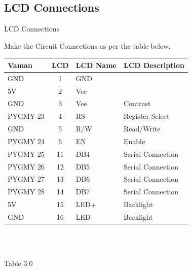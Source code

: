 \documentclass{beamer}
\theoremstyle{remark}
\begin{document}
\subsection{LCD Connections}
\begin{frame}{LCD Connections}
    \raggedright
    Make the Circuit Connections as per the table below.\\
    \vspace{0.25cm}
    \centering
        \begin{tabular}{|l|c|l|l|}
            \hline
            \textbf{Vaman} & \textbf{LCD} & \textbf{LCD Name} & \textbf{LCD Description} \\
            \hline
            GND & 1 & GND & \\
            \hline
            5V & 2 & Vcc & \\
            \hline
            GND & 3 & Vee & Contrast \\
            \hline
            PYGMY 23 & 4 & RS & Register Select \\
            \hline
            GND & 5 & R/W & Read/Write \\
            \hline
            PYGMY 24 & 6 & EN & Enable \\
            \hline
            PYGMY 25 & 11 & DB4 & Serial Connection \\
            \hline
            PYGMY 26 & 12 & DB5 & Serial Connection \\
            \hline
            PYGMY 27 & 13 & DB6 & Serial Connection \\
            \hline
            PYGMY 28 & 14 & DB7 & Serial Connection \\
            \hline
            5V & 15 & LED+ & Backlight \\
            \hline
            GND & 16 & LED- & Backlight \\
            \hline
        \end{tabular}
    \\
    \
    \centerline{Table 3.0}
\end{frame}
\end{document}
